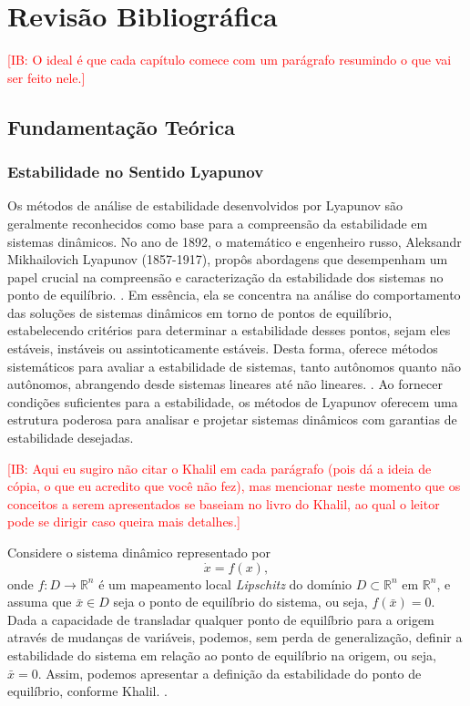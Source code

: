 \chapter{Revisão Bibliográfica} \label{cap2}

\textcolor{red}{[IB: O ideal é que cada capítulo comece com um parágrafo resumindo o que vai ser feito nele.]}

\section{Fundamentação Teórica}

\subsection{Estabilidade no Sentido Lyapunov}

Os métodos de análise de estabilidade desenvolvidos por Lyapunov são geralmente reconhecidos como base para a compreensão da estabilidade em sistemas dinâmicos. No ano de 1892, o matemático e engenheiro russo, Aleksandr Mikhailovich Lyapunov (1857-1917), propôs abordagens que desempenham um papel crucial na compreensão e caracterização da estabilidade dos sistemas no ponto de equilíbrio. \citep{lyapunov1892}. Em essência, ela se concentra na análise do comportamento das soluções de sistemas dinâmicos em torno de pontos de equilíbrio, estabelecendo critérios para determinar a estabilidade desses pontos, sejam eles estáveis, instáveis ou assintoticamente estáveis. Desta forma, oferece métodos sistemáticos para avaliar a estabilidade de sistemas, tanto autônomos quanto não autônomos, abrangendo desde sistemas lineares até não lineares. \cite{khalil2002}. Ao fornecer condições suficientes para a estabilidade, os métodos de Lyapunov oferecem uma estrutura poderosa para analisar e projetar sistemas dinâmicos com garantias de estabilidade desejadas.

\textcolor{red}{[IB: Aqui eu sugiro não citar o Khalil em cada parágrafo (pois dá a ideia de cópia, o que eu acredito que você não fez), mas mencionar neste momento que os conceitos a serem apresentados se baseiam no livro do Khalil, ao qual o leitor pode se dirigir caso queira mais detalhes.]}

Considere o sistema dinâmico representado por \begin{equation}\dot{x} = f(x), \end{equation} onde $f: D \rightarrow \mathbb{R}^n$ é um mapeamento local \textit{Lipschitz} do domínio $D \subset \mathbb{R}^n$ em $\mathbb{R}^n$, e assuma que $\bar{x} \in D$ seja o ponto de equilíbrio do sistema, ou seja, $f(\bar{x}) = 0$. Dada a capacidade de transladar qualquer ponto de equilíbrio para a origem através de mudanças de variáveis, podemos, sem perda de generalização, definir a estabilidade do sistema em relação ao ponto de equilíbrio na origem, ou seja, $\bar{x} = 0$. Assim, podemos apresentar a definição da estabilidade do ponto de equilíbrio, conforme Khalil. \cite{khalil2002}.

